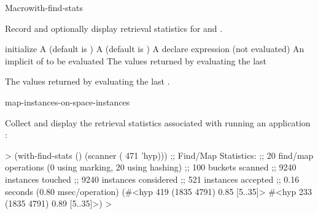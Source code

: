 \documentclass[10pt,twoside,english,pdftex]{article}
\begin{document}

\begin{functiondoc}{Macro}{with-find-stats}%
  {\code{(} \code{)}
    \superstar{}
    \superstar{} 
    \returns{} \superstar}
%
%
%
%
  
\fnsyntax

\fnpurpose 
{}%
%
Record and optionally display retrieval statistics for 
 and
.

\fnpackage {}

\fnmodule {}

\fnargs
\begin{args}{initialize}
\arg[initialize] A (default is )
\arg[report] A (default is )
\arg[declaration] A declare expression (not evaluated)
\arg[forms] An implicit  of  to be evaluated
\arg[results] The values returned by evaluating the last 
\end{args}

\fnreturns The values returned by evaluating the last .

\begin{alsos}{map-instances-on-space-instances}
\end{alsos}

\fnexample
{}%
Collect and display the retrieval statistics associated with
running an application  :
%
\W\supp
\begin{example}
  > (with-find-stats ()
       (scanner ( 471 'hyp)))
  ;; Find/Map Statistics:
  ;;        20 find/map operations (0 using marking, 20 using hashing)
  ;;       100 buckets scanned
  ;;      9240 instances touched
  ;;      9240 instances considered
  ;;       521 instances accepted
  ;;      0.16 seconds (0.80 msec/operation)
  (#<hyp 419 (1835 4791) 0.85 [5..35]>
   #<hyp 233 (1835 4791) 0.89 [5..35]>)
  >
\end{example}

\end{functiondoc}
\end{document}
